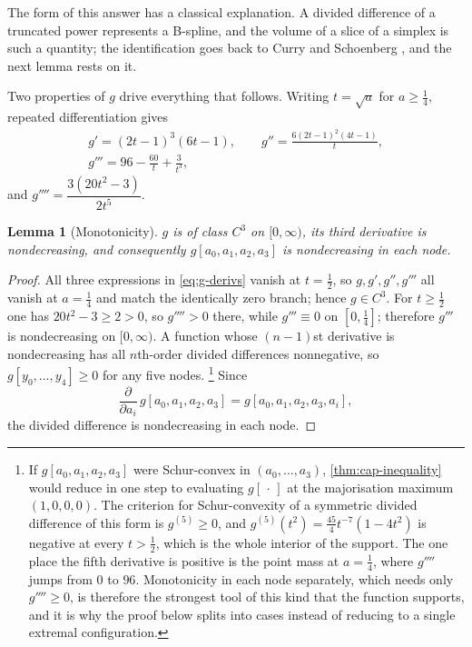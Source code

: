 \documentclass[11pt,reqno]{amsart}
\renewcommand{\_}{\origunderscore\allowbreak}
\numberwithin{equation}{section}
\theoremstyle{plain}
\newtheorem{lem}[thm]{Lemma}
\theoremstyle{definition}
\theoremstyle{remark}
\begin{document}
The form of this answer has a classical explanation. A divided
difference of a truncated power represents a B-spline, and the volume of
a slice of a simplex is such a quantity; the identification goes back to
Curry and Schoenberg \cite{CSc66}, and the next lemma rests on it.

Two properties of $g$ drive everything that follows. Writing $t=\sqrt a$
for $a\ge\tfrac14$, repeated differentiation gives
\begin{equation}\label{eq:g-derivs}
  \begin{gathered}
  g'=(2t-1)^3(6t-1),\qquad
  g''=\frac{6(2t-1)^2(4t-1)}{t},\\
  g'''=96-\frac{60}{t}+\frac{3}{t^3},
  \end{gathered}
\end{equation}
and $g''''=\dfrac{3(20t^2-3)}{2t^5}$.

\begin{lem}[Monotonicity]\label{lem:monotone}
$g$ is of class $C^3$ on $[0,\infty)$, its third derivative is
nondecreasing, and consequently $g[a_0,a_1,a_2,a_3]$ is nondecreasing in
each node.
\end{lem}

\begin{proof}
All three expressions in \cref{eq:g-derivs} vanish at $t=\tfrac12$, so
$g,g',g'',g'''$ all vanish at $a=\tfrac14$ and match the identically zero
branch; hence $g\in C^3$. For $t\ge\tfrac12$ one has $20t^2-3\ge2>0$, so
$g''''>0$ there, while $g'''\equiv0$ on $[0,\tfrac14]$; therefore $g'''$ is
nondecreasing on $[0,\infty)$. A function whose $(n-1)$st derivative is
nondecreasing has all $n$th-order divided differences nonnegative, so
$g[y_0,\dots,y_4]\ge0$ for any five nodes.%
\footnote{If $g[a_0,a_1,a_2,a_3]$ were Schur-convex in
  $(a_0,\dots,a_3)$, \cref{thm:cap-inequality} would reduce in one step
  to evaluating $g[\,\cdot\,]$ at the majorisation maximum $(1,0,0,0)$.
  The criterion for Schur-convexity of a symmetric divided difference of
  this form \cite[Ch.~3]{MOA11} is $g^{(5)}\ge0$, and
  $g^{(5)}(t^2)=\tfrac{45}{4}t^{-7}(1-4t^2)$ is negative at every
  $t>\tfrac12$, which is the whole interior of the support. The one
  place the fifth derivative is positive is the point mass at
  $a=\tfrac14$, where $g''''$ jumps from $0$ to $96$. Monotonicity in each node separately, which needs only
  $g''''\ge0$, is therefore the strongest tool of this kind that the
  function supports, and it is why the proof below splits into cases instead of reducing to a single extremal configuration.} Since
\[
  \frac{\partial}{\partial a_i}\,g[a_0,a_1,a_2,a_3]
  =g[a_0,a_1,a_2,a_3,a_i],
\]
the divided difference is nondecreasing in each node.
\end{proof}
\end{document}
